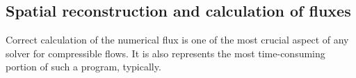 \documentclass[]{article}
\begin{document}

    \subsection{Spatial reconstruction and calculation of fluxes}

        Correct calculation of the numerical flux is one of the most crucial
        aspect of any solver for compressible flows. It is also represents the
        most time-consuming portion of such a program, typically.
\end{document}
